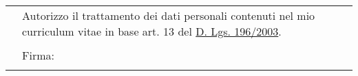 \documentclass[totpages, helvetica, openbib, italian]{europecv}
\begin{document}
\begin{europecv}


	\end{europecv}


	\null{}
	\flushright
	\begin{tabular}{rp{250pt}}
	 & \small Autorizzo il trattamento dei dati personali contenuti nel mio curriculum vitae in base art. 13 del \href{http://www.garanteprivacy.it/garante/doc.jsp?ID=1311248}{D. Lgs. 196/2003}.\\ 
	 &  \\ 
	 & Firma:\\ 
	 &  \\
	  \bottomrule
	\end{tabular}
\end{document}

